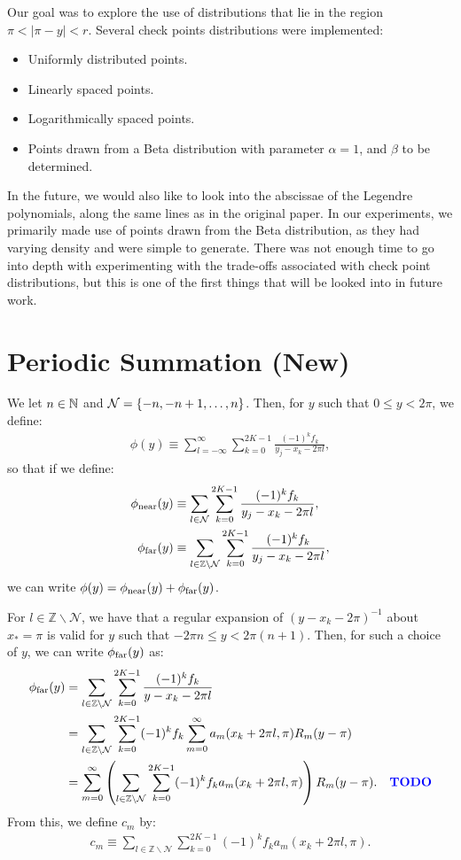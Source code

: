 Our goal was to explore the use of distributions that lie in the
region $\pi < |\pi - y| < r$. Several check points distributions were
implemented:
\begin{itemize}
\item Uniformly distributed points.
\item Linearly spaced points.
\item Logarithmically spaced points.
\item Points drawn from a Beta distribution with parameter
  $\alpha = 1$, and $\beta$ to be determined.
\end{itemize}
In the future, we would also like to look into the abscissae of the
Legendre polynomials, along the same lines as in the original
paper. In our experiments, we primarily made use of points drawn from
the Beta distribution, as they had varying density and were simple to
generate. There was not enough time to go into depth with
experimenting with the trade-offs associated with check point
distributions, but this is one of the first things that will be looked
into in future work.

\section{Periodic Summation (New)}

We let $n \in \mathbb{N}$ and $\mathcal{N} = \left\{-n, -n+1, \hdots,
  n\right\}$. Then, for $y$ such that $0 \leq y < 2\pi$, we define:
\begin{align*}
  \phi(y) \equiv \sum_{l=-\infty}^{\infty} \sum_{k=0}^{2K-1} \frac{(-1)^k f_k}{y_j - x_k - 2\pi l},
\end{align*}
so that if we define:
\begin{align*}
  \phi_{\operatorname{near}}(y) &\equiv \sum_{l \in \mathcal{N}} \sum_{k=0}^{2K-1} \frac{(-1)^k f_k}{y_j - x_k - 2\pi l}, \\
  \phi_{\operatorname{far}}(y) &\equiv \sum_{l \in \mathbb{Z} \backslash \mathcal{N}} \sum_{k=0}^{2K-1} \frac{(-1)^k f_k}{y_j - x_k - 2\pi l},
\end{align*}
we can write $\phi(y) = \phi_{\operatorname{near}}(y) + \phi_{\operatorname{far}}(y)$.

For $l \in \mathbb{Z} \backslash \mathcal{N}$, we have that a regular
expansion of $(y - x_k - 2\pi)^{-1}$ about $x_* = \pi$ is valid for
$y$ such that $-2\pi n \leq y < 2\pi(n+1)$. Then, for such a choice of
$y$, we can write $\phi_{\operatorname{far}}(y)$ as:
\begin{align*}
  \phi_{\operatorname{far}}(y) &= \sum_{l \in \mathbb{Z} \backslash \mathcal{N}} \sum_{k=0}^{2K-1} \frac{(-1)^k f_k}{y - x_k - 2\pi l} \\
  &= \sum_{l \in \mathbb{Z} \backslash \mathcal{N}} \sum_{k=0}^{2K-1} (-1)^k f_k \sum_{m=0}^\infty a_m(x_k + 2\pi l, \pi) R_m(y - \pi) \\
  &= \sum_{m=0}^\infty \left(\sum_{l \in \mathbb{Z} \backslash \mathcal{N}} \sum_{k=0}^{2K-1} (-1)^k f_k a_m(x_k + 2\pi l, \pi)\right) R_m(y - \pi). & \mbox{\color{blue}{\textbf{TODO}}}
\end{align*}
From this, we define $c_m$ by:
\begin{align*}
  c_m \equiv \sum_{l \in \mathbb{Z} \backslash \mathcal{N}} \sum_{k=0}^{2K-1} (-1)^k f_k a_m(x_k + 2\pi l, \pi).
\end{align*}

